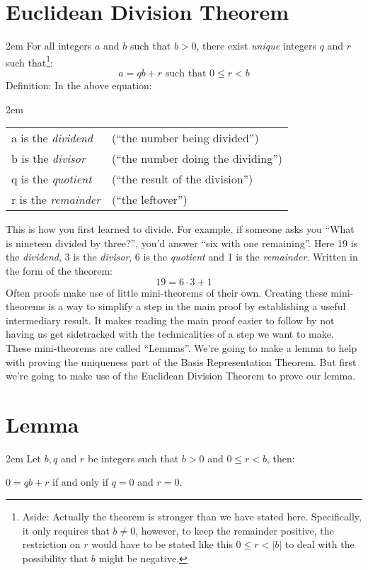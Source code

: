 \documentclass{article}
\newenvironment{jprIn}{\begin{adjustwidth}{2em}{}}{\end{adjustwidth}}
\begin{document}
\section*{Euclidean Division Theorem}
\begin{jprIn}
For all integers $a$ and $b$ such that $b>0$,
there exist \emph{unique} integers $q$ and $r$ such that\footnote{Aside:
Actually the theorem is stronger than we have stated here.
Specifically, it only requires that $b\ne0$, however,
to keep the remainder positive, the restriction on $r$
would have to be stated like
this $0\le{}r<\left|b\right|$ to deal with
the possibility that $b$ might be negative.}:
\[a=qb+r  \text{ such that } 0\le{}r<b\]
Definition: In the above equation:
\begin{jprIn}
\begin{tabular}{l l}
a is the \emph{dividend} & (``the number being divided'')\\
b is the \emph{divisor} & (``the number doing the dividing'')\\
q is the \emph{quotient} & (``the result of the division'')\\
r is the \emph{remainder} & (``the leftover'')
\end{tabular}
\end{jprIn}
\end{jprIn}
This is how you first learned to divide.
For example, if someone asks you ``What is nineteen divided by three?'', you’d
answer ``six with one remaining''. Here 19 is the \emph{dividend},  3 is the \emph{divisor},
6 is the \emph{quotient} and 1 is the \emph{remainder}. Written in the form of the theorem:
\[19=6\cdot3+1\]
Often proofs make use of little mini-theorems of their own.
Creating these mini-theorems is a way to simplify a step in
the main proof by establishing a useful
intermediary result. It makes reading the main proof
easier to follow by not having us get sidetracked with
the technicalities of a step we want to make.
These mini-theorems are called ``Lemmas''.
We're going to make a lemma to help with proving the uniqueness part
of the Basis Representation Theorem. But first we're going to make use of the
Euclidean Division Theorem to prove our lemma.

\section*{Lemma}
\begin{jprIn}
Let $b, q$ and $r$ be integers such that $b>0$ and $0\le{}r<b$, then:
\begin{center}
$0=qb+r$ 
\hspace{1.5em}if and only if\hspace{1.5em}
$q=0$ and $r=0$.
\end{center}
\end{jprIn}
\end{document}
